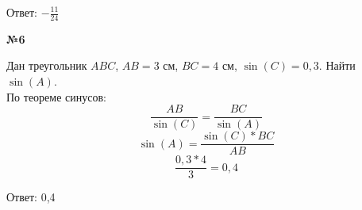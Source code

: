     Ответ: $-\frac{11}{24}$

    \begin{center}
        \textbf{№6}
    \end{center}

    Дан треугольник $ABC$, $AB = 3$ см, $BC = 4$ см, $\sin(C) = 0,3$.
    Найти $\sin(A)$.\\

    По теореме синусов:
    \[
        \frac{AB}{\sin(C)} = \frac{BC}{\sin(A)}
    \]
    \[ \sin(A) = \frac{\sin(C)*BC}{AB} \]
    \[
        \frac{0,3 * 4}{3} = 0,4
    \]

    Ответ: 0,4





